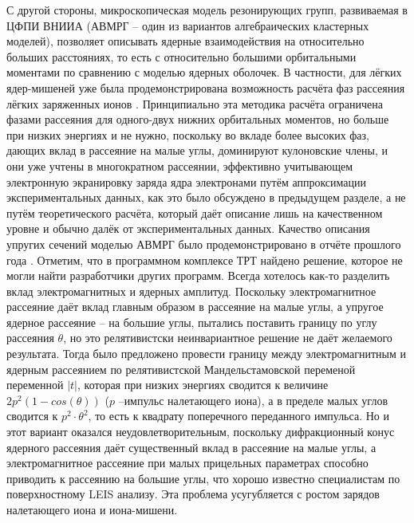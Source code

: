\documentclass[a4paper,12pt]{article}
\begin{document}
\begin{large}
	С другой стороны, микроскопическая модель резонирующих групп, развиваемая в ЦФПИ ВНИИА (АВМРГ -- один из вариантов алгебраических кластерных моделей), позволяет описывать ядерные взаимодействия на относительно больших расстояниях, то есть с относительно большими орбитальными моментами по сравнению с моделью ядерных оболочек.
	В частности, для лёгких ядер-мишеней уже была продемонстрирована возможность расчёта фаз рассеяния лёгких заряженных ионов \cite{IgashSol17}.
	Принципиально эта методика расчёта ограничена фазами рассеяния для одного-двух нижних орбитальных моментов, но больше при низких энергиях и не нужно, поскольку во вкладе более высоких фаз, дающих вклад в рассеяние на малые углы, доминируют кулоновские члены, и они уже учтены в многократном рассеянии, эффективно учитывающем электронную экранировку заряда ядра электронами путём аппроксимации экспериментальных данных, как это было обсуждено в предыдущем разделе, а не путём теоретического расчёта, который даёт описание лишь на качественном уровне и обычно далёк от экспериментальных данных.
	Качество описания упругих сечений моделью АВМРГ было продемонстрировано в отчёте прошлого года \cite{70/662-T}.
	Отметим, что в программном комплексе ТРТ найдено решение, которое не могли найти разработчики других программ.
	Всегда хотелось как-то разделить вклад электромагнитных и ядерных амплитуд.
	Поскольку электромагнитное рассеяние даёт вклад главным образом в рассеяние на малые углы, а упругое ядерное рассеяние -- на большие углы, пытались поставить границу по углу рассеяния $\theta$, но это релятивистски неинвариантное решение не даёт желаемого результата.
	Тогда было предложено провести границу между электромагнитным и ядерным рассеянием по релятивистской Мандельстамовской переменой переменной $|t|$, которая при низких энергиях сводится к величине $2p^2(1-cos(\theta))$ ($p$ --импульс налетающего иона), а в пределе малых углов сводится к $p^2\cdot\theta^2$, то есть к квадрату поперечного переданного импульса.
	Но и этот вариант оказался неудовлетворительным, поскольку дифракционный конус ядерного рассеяния даёт существенный вклад в рассеяние на малые углы, а электромагнитное рассеяние при малых прицельных параметрах способно приводить к рассеянию на большие углы, что хорошо известно специалистам по поверхностному LEIS анализу.
	Эта проблема усугубляется с ростом зарядов налетающего иона и иона-мишени.


\end{large}
\end{document}
